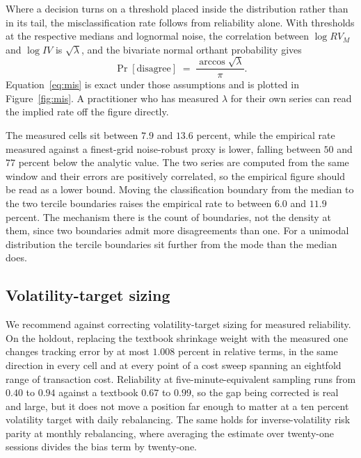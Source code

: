 Where a decision turns on a threshold placed inside the distribution rather than
in its tail, the misclassification rate follows from reliability alone. With
thresholds at the respective medians and lognormal noise, the correlation between
$\log RV_M$ and $\log IV$ is $\sqrt{\lambda}$, and the bivariate normal orthant
probability gives
\begin{equation}\label{eq:mis}
\Pr\left[\text{disagree}\right] \;=\; \frac{\arccos\!\sqrt{\lambda}}{\pi}.
\end{equation}
Equation~\eqref{eq:mis} is exact under those assumptions and is plotted in
Figure~\ref{fig:mis}. A practitioner who has measured $\lambda$ for their own
series can read the implied rate off the figure directly.

The measured cells sit between $7.9$ and $13.6$ percent, while the empirical rate %
measured against a finest-grid noise-robust proxy is lower, falling between $50$
and $77$ percent below the analytic value. The two series are computed from the
same window and their errors are positively correlated, so the empirical figure
should be read as a lower bound. Moving the classification boundary from the
median to the two tercile boundaries raises the empirical rate to between $6.0$ %
and $11.9$ percent. The mechanism there is the count of boundaries, not the
density at them, since two boundaries admit more disagreements than one. For a
unimodal distribution the tercile boundaries sit further from the mode than the
median does.

\subsection{Volatility-target sizing}

We recommend against correcting volatility-target sizing for measured
reliability. On the holdout, replacing the textbook shrinkage weight with the
measured one changes tracking error by at most $1.008$ percent in relative terms,
in the same direction in every cell and at every point of a cost sweep spanning
an eightfold range of transaction cost. Reliability at five-minute-equivalent
sampling runs from $0.40$ to $0.94$ against a textbook $0.67$ to $0.99$, so the %
gap being corrected is real and large, but it does not move a position far enough
to matter at a ten percent volatility target with daily rebalancing. The same holds
for inverse-volatility risk parity at monthly rebalancing, where averaging the
estimate over twenty-one sessions divides the bias term by twenty-one.

